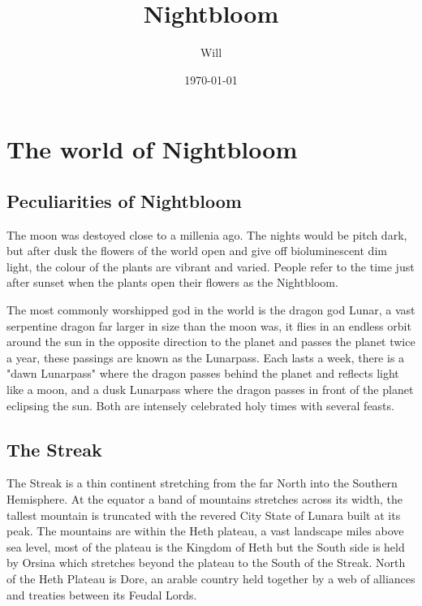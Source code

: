 \documentclass[10pt,twoside,twocolumn,openany,justified,bg=full,nomultitoc]{dndbook}
\author{Will}
\date{\today}
\title{Nightbloom}
\begin{document}
\maketitle
\tableofcontents
\chapter{The world of Nightbloom}
\label{sec-1}
\section{Peculiarities of Nightbloom}
\label{sec-1-1}
The moon was destoyed close to a millenia ago. The nights would be pitch dark, but after dusk the flowers of the world open and give off bioluminescent dim light, the colour of the plants are vibrant and varied. People refer to the time just after sunset when the plants open their flowers as the Nightbloom. 

The most commonly worshipped god in the world is the dragon god Lunar, a vast serpentine dragon far larger in size than the moon was, it flies in an endless orbit around the sun in the opposite direction to the planet and passes the planet twice a year, these passings are known as the Lunarpass. Each lasts a week, there is a "dawn Lunarpass" where the dragon passes behind the planet and reflects light like a moon, and a dusk Lunarpass where the dragon passes in front of the planet eclipsing the sun. Both are intensely celebrated holy times with several feasts. 

\section{The Streak}
\label{sec-1-2}
The Streak is a thin continent stretching from the far North into the Southern Hemisphere. At the equator a band of mountains stretches across its width, the tallest mountain is truncated with the revered City State of Lunara built at its peak. The mountains are within the Heth plateau, a vast landscape miles above sea level, most of the plateau is the Kingdom of Heth but the South side is held by Orsina which stretches beyond the plateau to the South of the Streak. North of the Heth Plateau is Dore, an arable country held together by a web of alliances and treaties between its Feudal Lords.
\end{document}
